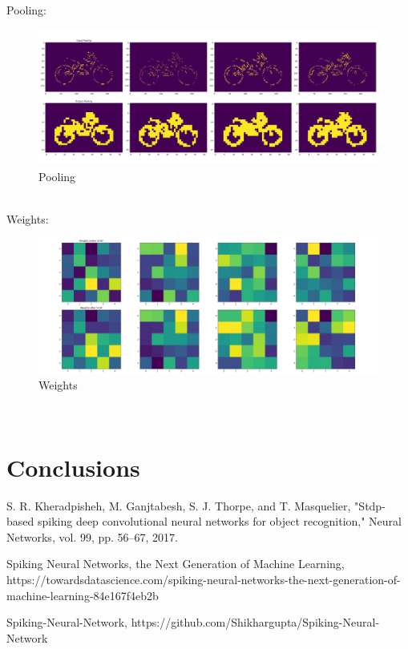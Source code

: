 \documentclass[11pt,a4paper]{scrartcl}
\begin{document}
Pooling:
\begin{figure}[h]
	\centering
	\includegraphics[width=\textwidth]{images/pool_slice1}
	\caption{Pooling}
	\label{fig:pool}
\end{figure}\\
Weights:
\begin{figure}[h]
	\centering
	\includegraphics[width=\textwidth]{images/weights_slice1}
	\caption{Weights}
	\label{fig:weights}
\end{figure}\\
\section{Conclusions}

\clearpage

\begin{thebibliography}{5}

S. R. Kheradpisheh, M. Ganjtabesh, S. J. Thorpe, and
T. Masquelier, "Stdp-based spiking deep convolutional neural
networks for object recognition," Neural Networks, vol. 99,
pp. 56–67, 2017.

Spiking Neural Networks, the Next Generation of Machine Learning, https://towardsdatascience.com/spiking-neural-networks-the-next-generation-of-machine-learning-84e167f4eb2b

Spiking-Neural-Network, https://github.com/Shikhargupta/Spiking-Neural-Network
\end{thebibliography}
\end{document}
